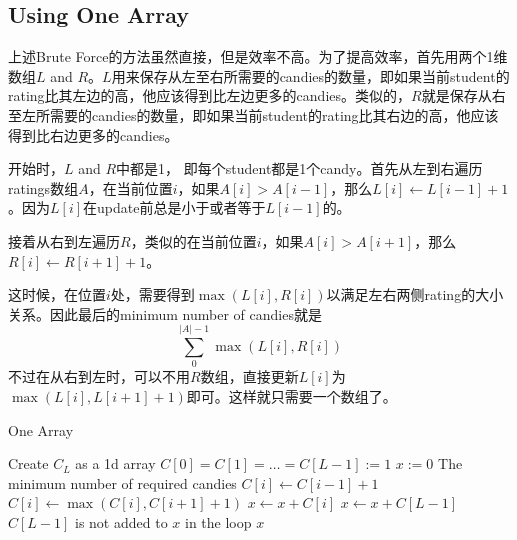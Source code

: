 \subsection{Using One Array}
上述Brute Force的方法虽然直接，但是效率不高。为了提高效率，首先用两个1维数组$L$ and $R$。$L$用来保存从左至右所需要的candies的数量，即如果当前student的rating比其左边的高，他应该得到比左边更多的candies。类似的，$R$就是保存从右至左所需要的candies的数量，即如果当前student的rating比其右边的高，他应该得到比右边更多的candies。
\par
开始时，$L$ and $R$中都是1， 即每个student都是1个candy。首先从左到右遍历ratings数组$A$，在当前位置$i$，如果$A[i]>A[i-1]$，那么$L[i]\gets L[i-1]+1$。因为$L[i]$在update前总是小于或者等于$L[i-1]$的。
\par
接着从右到左遍历$R$，类似的在当前位置$i$，如果$A[i]>A[i+1]$，那么$R[i]\gets R[i+1]+1$。
\par
这时候，在位置$i$处，需要得到$\max(L[i],R[i])$以满足左右两侧rating的大小关系。因此最后的minimum number of candies就是
\[
\sum_{0}^{|A|-1}\max(L[i], R[i])
\]
不过在从右到左时，可以不用$R$数组，直接更新$L[i]$为$\max(L[i], L[i+1]+1)$即可。这样就只需要一个数组了。
\setcounter{algorithm}{0}
\begin{algorithm}[H]
\caption{One Array}
\begin{algorithmic}[1]
\State Create $C_{L}$ as a 1d array
\State $C[0]=C[1]=\ldots=C[L-1]:=1$
\State $x:=0$ \Comment The minimum number of required candies
\State $C[i]\gets C[i-1]+1$
\EndIf
\EndFor
{}
\State $C[i]\gets \max(C[i], C[i+1]+1)$
\EndIf
\State $x\gets x+C[i]$
\EndFor
\State $x\gets x+C[L-1]$ \Comment $C[L-1]$ is not added to $x$ in the loop
\State \Return $x$
\end{algorithmic}
\end{algorithm}
\begin{algorithm}[H]
\begin{algorithmic}[1]
\EndProcedure
\end{algorithmic}
\end{algorithm}
